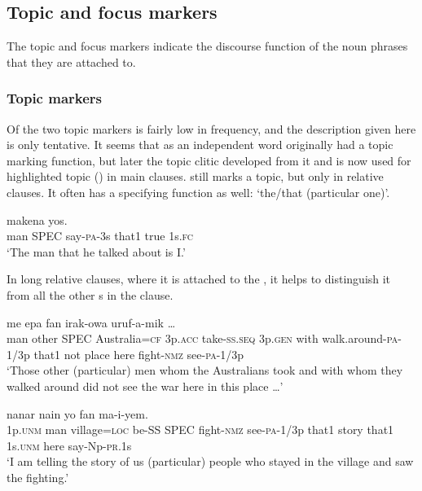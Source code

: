 \subsection{Topic and focus markers}
{}
The topic and focus markers indicate the discourse function of the noun phrases that they are attached to.

\subsubsection[Topic markers]{Topic markers}
{}
Of the two topic markers  is fairly low in frequency, and the description given here is only tentative. It seems that  as an independent word originally had a topic marking function, but later the topic clitic  developed from it and is now used for highlighted topic () in main clauses.  still marks a topic, but only in relative clauses. It often has a specifying function as well: `the/that (particular one)'. 

\ea%
\label{ex:x1681}
 makena yos. \\
man SPEC say-\textsc{pa}-3s that1 true 1s.\textsc{fc}\\
\glt`The man that he talked about is I.'
\z

In long relative clauses, where it is attached to the , it helps to distinguish it from all the other s in the clause. 

\ea%
\label{ex:x1815}
\gll [\textstyleEmphasizedVernacularWords{Mua} \textstyleEmphasizedVernacularWords{papako} \textstyleEmphasizedVernacularWords{ena} Australia=ke wia aaw-ep wiena feekiya yiaw-e-mik nain] me epa fan irak-owa uruf-a-mik {\dots}\\
man other SPEC Australia=\textsc{cf} 3p.\textsc{acc} take-\textsc{ss}.\textsc{seq} 3p.\textsc{gen} with walk.around-\textsc{pa}-1/3p that1 not place here fight-\textsc{nmz} see-\textsc{pa}-1/3p\\
\glt`Those other (particular) men whom the Australians took and with whom they walked around did not see the war here in this place {\dots}'
\z

\ea%
\label{ex:x1683}
\gll [\textstyleEmphasizedVernacularWords{I} mua owowa=pa ik-ok \textstyleEmphasizedVernacularWords{ena} irakowa uruf-a-mik nain] nanar nain yo fan ma-i-yem.\\
1p.\textsc{unm} man village=\textsc{loc} be-SS SPEC fight-\textsc{nmz} see-\textsc{pa}-1/3p that1 story that1 1s.\textsc{unm} here say-Np-\textsc{pr}.1s\\
\glt`I am telling the story of us (particular) people who stayed in the village and saw the fighting.'
\z

